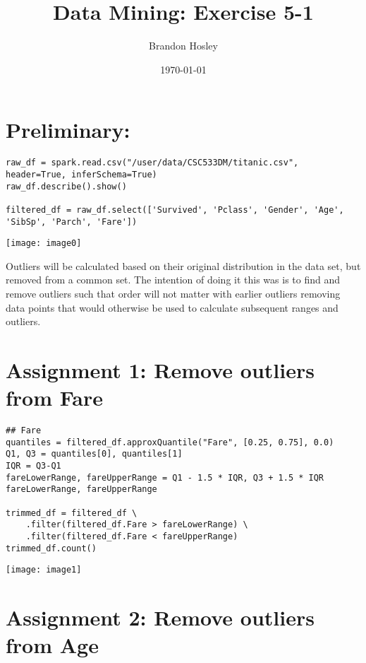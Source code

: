 \documentclass[]{article}
\title{Data Mining: Exercise 5-1}
\author{Brandon Hosley}
\date{\today}
\begin{document}
\maketitle

\section*{Preliminary: }

\begin{verbatim}
raw_df = spark.read.csv("/user/data/CSC533DM/titanic.csv", header=True, inferSchema=True)
raw_df.describe().show()

filtered_df = raw_df.select(['Survived', 'Pclass', 'Gender', 'Age', 'SibSp', 'Parch', 'Fare'])
\end{verbatim}
\texttt{[image: image0]}

Outliers will be calculated based on their original distribution in the data set, but removed from a common set. The intention of doing it this was is to find and remove outliers such that order will not matter with earlier outliers removing data points that would otherwise be used to calculate subsequent ranges and outliers.

\section*{Assignment 1: Remove outliers from Fare}

\begin{verbatim}
## Fare
quantiles = filtered_df.approxQuantile("Fare", [0.25, 0.75], 0.0)
Q1, Q3 = quantiles[0], quantiles[1]
IQR = Q3-Q1
fareLowerRange, fareUpperRange = Q1 - 1.5 * IQR, Q3 + 1.5 * IQR
fareLowerRange, fareUpperRange

trimmed_df = filtered_df \
	.filter(filtered_df.Fare > fareLowerRange) \
	.filter(filtered_df.Fare < fareUpperRange)
trimmed_df.count()
\end{verbatim}
\texttt{[image: image1]}


\section*{Assignment 2: Remove outliers from Age}
\end{document}
